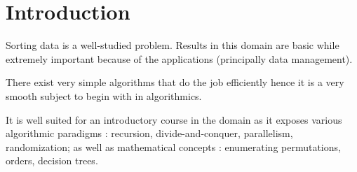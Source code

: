 \section{Introduction}
\label{tree:sorting:intro}

Sorting data is a well-studied problem. Results in this domain are basic while
extremely important because of the applications (principally data management).

There exist very simple algorithms that do the job efficiently hence it is a
very smooth subject to begin with in algorithmics.

It is well suited for an introductory course in the domain as it exposes
various algorithmic paradigms : recursion, divide-and-conquer, parallelism,
randomization; as well as mathematical concepts : enumerating permutations,
orders, decision trees.
